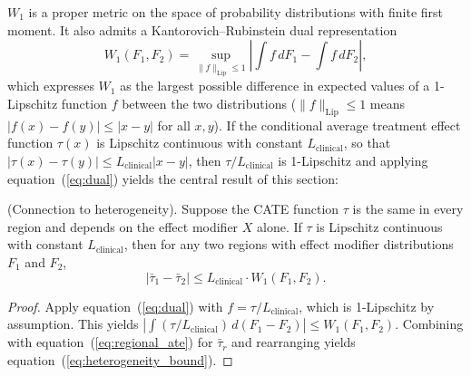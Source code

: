 \documentclass[AMA,Times1COL]{WileyNJDv5}
\begin{document}
$W_1$ is a proper metric on the space of probability distributions with finite first moment.\cite{villani2009} It also admits a Kantorovich--Rubinstein dual representation\cite{villani2009}
\begin{equation}
W_1(F_1, F_2) = \sup_{\|f\|_{\text{Lip}} \leq 1} \left|\int f \, dF_1 - \int f \, dF_2\right|,
\label{eq:dual}
\end{equation}
which expresses $W_1$ as the largest possible difference in expected values of a 1-Lipschitz function $f$ between the two distributions ($\|f\|_{\text{Lip}} \leq 1$ means $|f(x) - f(y)| \leq |x - y|$ for all $x, y$). If the conditional average treatment effect function $\tau(x)$ is Lipschitz continuous with constant $L_{\text{clinical}}$, so that $|\tau(x) - \tau(y)| \leq L_{\text{clinical}} |x - y|$, then $\tau / L_{\text{clinical}}$ is 1-Lipschitz and applying equation~(\ref{eq:dual}) yields the central result of this section:

\begin{proposition}\label{prop:heterogeneity}
\textup{(Connection to heterogeneity).} Suppose the CATE function $\tau$ is the same in every region and depends on the effect modifier $X$ alone. If $\tau$ is Lipschitz continuous with constant $L_{\text{clinical}}$, then for any two regions with effect modifier distributions $F_1$ and $F_2$,
\begin{equation}
|\bar{\tau}_1 - \bar{\tau}_2| \leq L_{\text{clinical}} \cdot W_1(F_1, F_2).
\label{eq:heterogeneity_bound}
\end{equation}
\end{proposition}

\begin{proof}
Apply equation~(\ref{eq:dual}) with $f = \tau / L_{\text{clinical}}$, which is 1-Lipschitz by assumption. This yields $\left|\int (\tau / L_{\text{clinical}}) \, d(F_1 - F_2)\right| \leq W_1(F_1, F_2)$. Combining with equation~(\ref{eq:regional_ate}) for $\bar{\tau}_r$ and rearranging yields equation~(\ref{eq:heterogeneity_bound}).
\end{proof}
\end{document}
